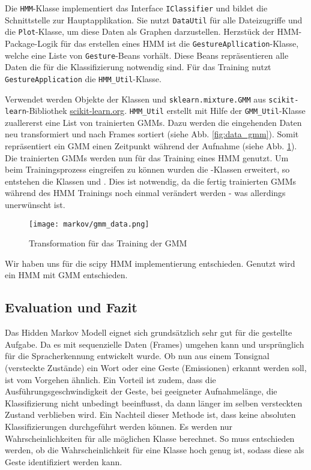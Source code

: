 Die \texttt{HMM}-Klasse implementiert das Interface \texttt{IClassifier} und bildet die Schnittstelle zur Hauptapplikation. Sie nutzt \texttt{DataUtil}
 für alle Dateizugriffe und die \texttt{Plot}-Klasse, um diese Daten als Graphen darzustellen. Herzstück der HMM-Package-Logik für das erstellen eines
  \acl{HMM} ist die \texttt{GestureApllication}-Klasse, welche eine Liste von \texttt{Gesture}-Beans vorhält. Diese Beans repräsentieren alle Daten die für 
 die Klassifizierung notwendig sind. Für das Training nutzt \texttt{GestureApplication} die \texttt{HMM\_Util}-Klasse.

Verwendet werden Objekte der Klassen  und \texttt{sklearn.mixture.GMM} aus \texttt{scikit-learn}-Bibliothek \url{scikit-learn.org}.
\texttt{HMM\_Util} erstellt mit Hilfe der \texttt{GMM\_Util}-Klasse zuallererst eine List von trainierten \acl{GMM}s. Dazu werden die eingehenden Daten 
neu transformiert und nach Frames sortiert (siehe Abb. \ref{fig:data_gmm}). Somit repräsentiert ein \acl{GMM} einen Zeitpunkt während der Aufnahme 
(siehe Abb. \ref{fig:gmm_data}). Die trainierten \acl{GMM}s werden nun für das Training eines \acl{HMM} genutzt. Um beim Trainingsprozess eingreifen zu können
wurden die -Klassen erweitert, so entstehen die Klassen  und . Dies ist notwendig, da die fertig trainierten
\acl{GMM}s während des \acl{HMM} Trainings noch einmal verändert werden - was allerdings unerwünscht ist. 

\begin{figure}[htbp] \centering
    \texttt{[image: markov/gmm\_data.png]}
    \caption{Transformation für das Training der \acl{GMM}}
    \label{fig:gmm_data}
\end{figure}


Wir haben uns für die scipy HMM implementierung entschieden. 
Genutzt wird ein \acl{HMM} mit \acl{GMM} entschieden.


\subsection{Evaluation und Fazit}  \label{sec:result}
Das Hidden Markov Modell eignet sich grundsätzlich sehr gut für die gestellte Aufgabe. Da es mit sequenzielle Daten (Frames) umgehen 
kann und ursprünglich für die Spracherkennung entwickelt wurde. Ob nun aus einem Tonsignal (versteckte Zustände) ein Wort oder 
eine Geste (Emissionen) erkannt werden soll, ist vom Vorgehen ähnlich. Ein Vorteil ist zudem, dass die Ausführungsgeschwindigkeit
 der Geste, bei geeigneter Aufnahmelänge, die Klassifizierung nicht unbedingt beeinflusst, da dann länger im selben versteckten 
 Zustand verblieben wird.
Ein Nachteil dieser Methode ist, dass keine absoluten Klassifizierungen durchgeführt werden können. Es werden nur Wahrscheinlichkeiten für alle möglichen Klasse berechnet. So muss entschieden werden, ob die Wahrscheinlichkeit für eine Klasse hoch genug ist, sodass diese als Geste identifiziert werden kann.
